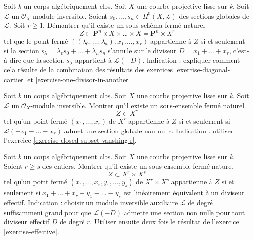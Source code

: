 \begin{exercise}
\label{exercise-closed-subset-vanshing-r}
Soit $k$ un corps algébriquement clos. Soit $X$ une courbe projective lisse
sur $k$. Soit $\mathcal{L}$ un $\mathcal{O}_X$-module inversible.
Soient $s_0, \ldots, s_n \in H^0(X, \mathcal{L})$
des sections globales de $\mathcal{L}$. Soit $r \geq 1$.
Démontrer qu'il existe un sous-schéma fermé naturel
$$
Z \subset
\mathbf{P}^n \times X \times \ldots \times X = \mathbf{P}^n \times X^r
$$
tel que le point fermé
$((\lambda_0 : \ldots : \lambda_n), x_1, \ldots, x_r)$
appartienne à $Z$ si et seulement si la section
$s_\lambda = \lambda_0 s_0 + \ldots + \lambda_n s_n$
s'annule sur le diviseur $D = x_1 + \ldots + x_r$, c'est-à-dire que
la section $s_\lambda$ appartient à $\mathcal{L}(-D)$.
Indication : expliquer comment cela résulte de la combinaison des résultats des
exercices \ref{exercise-diagonal-cartier} et
\ref{exercise-one-divisor-in-another}.
\end{exercise}

\begin{exercise}
\label{exercise-effective}
Soit $k$ un corps algébriquement clos. Soit $X$ une courbe projective lisse
sur $k$. Soit $\mathcal{L}$ un $\mathcal{O}_X$-module inversible.
Montrer qu'il existe un sous-ensemble fermé naturel
$$
Z \subset X^r
$$
tel qu'un point fermé $(x_1, \ldots, x_r)$ de $X^r$ appartienne à $Z$
si et seulement si $\mathcal{L}(-x_1 - \ldots -x_r)$ admet une section
globale non nulle. Indication : utiliser l'exercice \ref{exercise-closed-subset-vanshing-r}.
\end{exercise}

\begin{exercise}
\label{exercise-difference-effective}
Soit $k$ un corps algébriquement clos. Soit $X$ une courbe projective lisse
sur $k$. Soient $r \geq s$ des entiers. Montrer qu'il existe un sous-ensemble fermé
naturel
$$
Z \subset X^r \times X^s
$$
tel qu'un point fermé $(x_1, \ldots, x_r, y_1, \ldots, y_s)$ de
$X^r \times X^s$ appartienne à $Z$
si et seulement si $x_1 + \ldots + x_r - y_1 - \ldots - y_s$
est linéairement équivalent à un diviseur effectif.
Indication : choisir un module inversible auxiliaire $\mathcal{L}$
de degré suffisamment grand pour que $\mathcal{L}(-D)$ admette une section
non nulle pour tout diviseur effectif $D$ de degré $r$.
Utiliser ensuite deux fois le résultat de l'exercice \ref{exercise-effective}.
\end{exercise}

